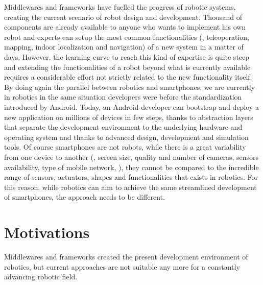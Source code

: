 Middlewares and frameworks have fuelled the progress of robotic systems, creating the current scenario of robot design and development. Thousand of components are already available to anyone who wants to implement his own robot and experts can setup the most common functionalities (\ie, teleoperation, mapping, indoor localization and navigation) of a new system in a matter of days. However, the learning curve to reach this kind of expertise is quite steep and extending the functionalities of a robot beyond what is currently available requires a considerable effort not strictly related to the new functionality itself.  By doing again the parallel between robotics and smartphones, we are currently in robotics in the same situation developers were before the standardization introduced by Android. Today, an Android developer can bootstrap and deploy a new application on millions of devices in few steps, thanks to abstraction layers that separate the development environment to the underlying hardware and operating system and thanks to advanced design, development and simulation tools. Of course smartphones are not robots, while there is a great variability from one device to another (\eg, screen size, quality and number of cameras, sensors availability, type of mobile network, \etc), they cannot be compared to the incredible range of sensors, actuators, shapes and functionalities that exists in robotics. For this reason, while robotics can aim to achieve the same streamlined development of smartphones, the approach needs to be different.

\section{Motivations}
Middlewares and frameworks created the present development environment of robotics, but current approaches are not suitable any more for a constantly advancing robotic field. 
